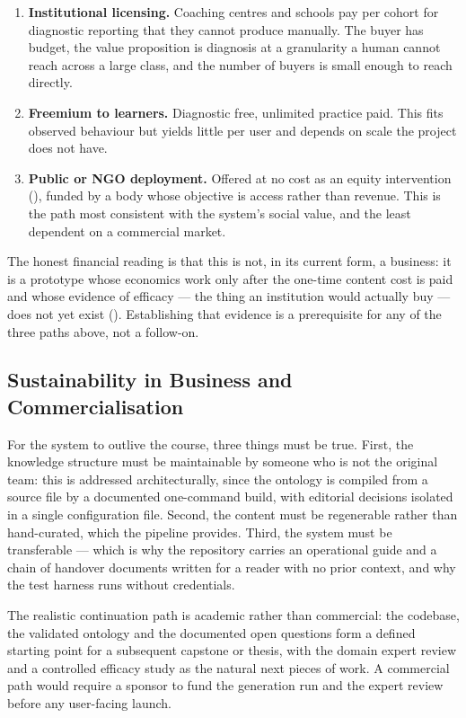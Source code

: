 \begin{enumerate}
  \item \textbf{Institutional licensing.} Coaching centres and schools pay per
    cohort for diagnostic reporting that they cannot produce manually. The buyer
    has budget, the value proposition is diagnosis at a granularity a human
    cannot reach across a large class, and the number of buyers is small enough
    to reach directly.
  \item \textbf{Freemium to learners.} Diagnostic free, unlimited practice paid.
    This fits observed behaviour but yields little per user and depends on scale
    the project does not have.
  \item \textbf{Public or NGO deployment.} Offered at no cost as an equity
    intervention (), funded by a body whose objective is access
    rather than revenue. This is the path most consistent with the system's
    social value, and the least dependent on a commercial market.
\end{enumerate}

The honest financial reading is that this is not, in its current form, a
business: it is a prototype whose economics work only after the one-time content
cost is paid and whose evidence of efficacy --- the thing an institution would
actually buy --- does not yet exist (). Establishing that
evidence is a prerequisite for any of the three paths above, not a follow-on.

\subsection{Sustainability in Business and Commercialisation}
\label{sec:commercialisation}

For the system to outlive the course, three things must be true. First, the
knowledge structure must be maintainable by someone who is not the original
team: this is addressed architecturally, since the ontology is compiled from a
source file by a documented one-command build, with editorial decisions
isolated in a single configuration file. Second, the content must be
regenerable rather than hand-curated, which the pipeline provides. Third, the
system must be transferable --- which is why the repository carries an
operational guide and a chain of handover documents written for a reader with no
prior context, and why the test harness runs without credentials.

The realistic continuation path is academic rather than commercial: the
codebase, the validated ontology and the documented open questions form a
defined starting point for a subsequent capstone or thesis, with the domain
expert review and a controlled efficacy study as the natural next pieces of
work. A commercial path would require a sponsor to fund the generation run and
the expert review before any user-facing launch.

